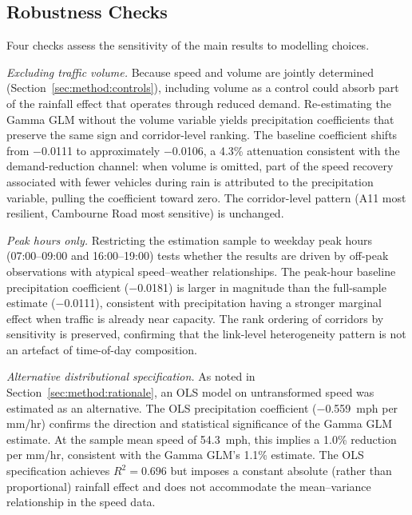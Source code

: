 \documentclass[review,authoryear]{elsarticle}
\begin{document}
\subsection{Robustness Checks}
\label{sec:disc:robust}

Four checks assess the sensitivity of the main results to modelling choices.

\textit{Excluding traffic volume.} Because speed and volume are jointly determined (Section~\ref{sec:method:controls}), including volume as a control could absorb part of the rainfall effect that operates through reduced demand. Re-estimating the Gamma GLM without the volume variable yields precipitation coefficients that preserve the same sign and corridor-level ranking. The baseline coefficient shifts from $-$0.0111 to approximately $-$0.0106, a 4.3\% attenuation consistent with the demand-reduction channel: when volume is omitted, part of the speed recovery associated with fewer vehicles during rain is attributed to the precipitation variable, pulling the coefficient toward zero. The corridor-level pattern (A11 most resilient, Cambourne Road most sensitive) is unchanged.

\textit{Peak hours only.} Restricting the estimation sample to weekday peak hours (07:00--09:00 and 16:00--19:00) tests whether the results are driven by off-peak observations with atypical speed--weather relationships. The peak-hour baseline precipitation coefficient ($-$0.0181) is larger in magnitude than the full-sample estimate ($-$0.0111), consistent with precipitation having a stronger marginal effect when traffic is already near capacity. The rank ordering of corridors by sensitivity is preserved, confirming that the link-level heterogeneity pattern is not an artefact of time-of-day composition.

\textit{Alternative distributional specification.} As noted in Section~\ref{sec:method:rationale}, an OLS model on untransformed speed was estimated as an alternative. The OLS precipitation coefficient ($-$0.559~\si{mph} per \si{mm/hr}) confirms the direction and statistical significance of the Gamma GLM estimate. At the sample mean speed of 54.3~\si{mph}, this implies a 1.0\% reduction per \si{mm/hr}, consistent with the Gamma GLM's 1.1\% estimate. The OLS specification achieves $R^2 = 0.696$ but imposes a constant absolute (rather than proportional) rainfall effect and does not accommodate the mean--variance relationship in the speed data.
\end{document}
